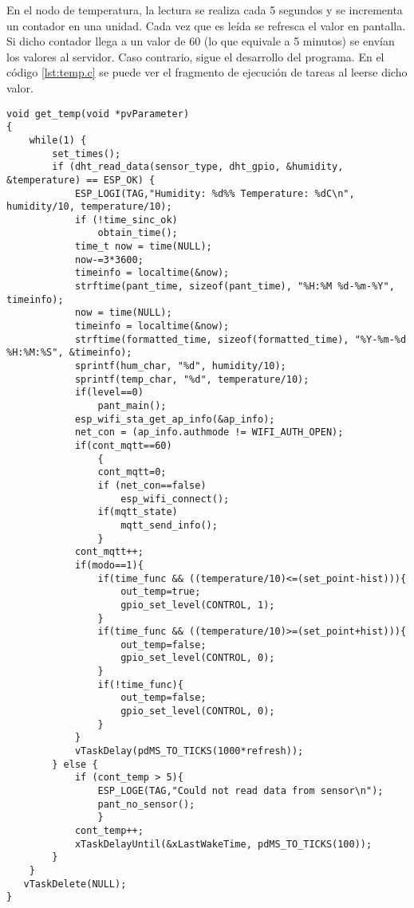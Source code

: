 En el nodo de temperatura, la lectura se realiza cada 5 segundos y se incrementa un contador en una unidad. Cada vez que es leída se refresca el valor en pantalla. Si dicho contador llega a un valor de 60 (lo que equivale a 5 minutos) se envían los valores al servidor. Caso contrario, sigue el desarrollo del programa. En el código \ref{lst:temp.c} se puede ver el fragmento de ejecución de tareas al leerse dicho valor.

\begin{lstlisting}[caption={Código de lectura de temperatura.}, label={lst:temp.c}]
void get_temp(void *pvParameter)
{
    while(1) {
        set_times();
        if (dht_read_data(sensor_type, dht_gpio, &humidity, &temperature) == ESP_OK) {
            ESP_LOGI(TAG,"Humidity: %d%% Temperature: %dC\n", humidity/10, temperature/10);
            if (!time_sinc_ok)
                obtain_time();
            time_t now = time(NULL);
            now-=3*3600;
            timeinfo = localtime(&now);
            strftime(pant_time, sizeof(pant_time), "%H:%M %d-%m-%Y", timeinfo);
            now = time(NULL);
            timeinfo = localtime(&now);
            strftime(formatted_time, sizeof(formatted_time), "%Y-%m-%d %H:%M:%S", &timeinfo);
            sprintf(hum_char, "%d", humidity/10);
			sprintf(temp_char, "%d", temperature/10);
            if(level==0)
                pant_main();
            esp_wifi_sta_get_ap_info(&ap_info);
            net_con = (ap_info.authmode != WIFI_AUTH_OPEN);
            if(cont_mqtt==60)
                {
                cont_mqtt=0;
                if (net_con==false)
                    esp_wifi_connect();
                if(mqtt_state)    
                    mqtt_send_info();
                }
            cont_mqtt++;
            if(modo==1){
                if(time_func && ((temperature/10)<=(set_point-hist))){
                    out_temp=true;
                    gpio_set_level(CONTROL, 1);
                }
                if(time_func && ((temperature/10)>=(set_point+hist))){
                    out_temp=false;
                    gpio_set_level(CONTROL, 0);
                }
                if(!time_func){
                    out_temp=false;
                    gpio_set_level(CONTROL, 0);
                }
            }
            vTaskDelay(pdMS_TO_TICKS(1000*refresh));
        } else {
            if (cont_temp > 5){
                ESP_LOGE(TAG,"Could not read data from sensor\n");
			    pant_no_sensor();
                }
            cont_temp++;
            xTaskDelayUntil(&xLastWakeTime, pdMS_TO_TICKS(100));
        }
    }
   vTaskDelete(NULL);
}
\end{lstlisting}

